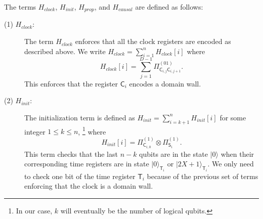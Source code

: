 \documentclass[11pt,letterpaper]{article}
\theoremstyle{definition}
\theoremstyle{remark}
\renewcommand{\leq}{\leqslant}
\numberwithin{equation}{section}
\theoremstyle{definition}
\newcommand{\ket}[1]{|#1\rangle}
\newcommand{\sC}{{\mathsf{C}}}
\newcommand{\sS}{{\mathsf{S}}}
\newcommand{\sT}{{\mathsf{T}}}
\begin{document}
The terms $H_{clock}$, $H_{init}$, $H_{prop}$, and $H_{causal}$ are defined as follows:
\begin{description}
  \item[(1) $H_{clock}$: ] The term $H_{clock}$ enforces that all the clock registers are encoded as described above. We write $H_{clock} = \sum_{i = 1}^n H_{clock}[i]$ where
%
%
%
%
  \begin{equation}
  \label{eq:clock}
      H_{clock}[i] = \sum_{j = 1}^{D-1} \Pi_{\sC_{i,j} \sC_{i,j+1}}^{(01)}.
  \end{equation}
  This enforces that the register $\sC_i$ encodes a domain wall.
%
  \item[(2) $H_{init}$: ] The initialization term is defined as $H_{init} = \sum_{i = k+1}^n H_{init}[i]$ for some integer $1\leq k \leq n$, \footnote{In our case, $k$ will eventually be the number of logical qubits.} where
%
%
%
%
\begin{equation}
\label{eq:init_term}
  H_{init}[i] = \Pi_{\sC_{i,0}}^{(1)} \otimes \Pi_{\sS_i}^{(1)}.
\end{equation}
This term checks that the last $n-k$ qubits are in the state $\ket{0}$ when their corresponding time registers are in state $\ket{0}_{\sT_i}$ or $\ket{2X+1}_{\sT_i}$. We only need to check one bit of the time register $\sT_i$ because of the previous set of terms enforcing that the clock is a domain wall.%


\end{description}
\end{document}
